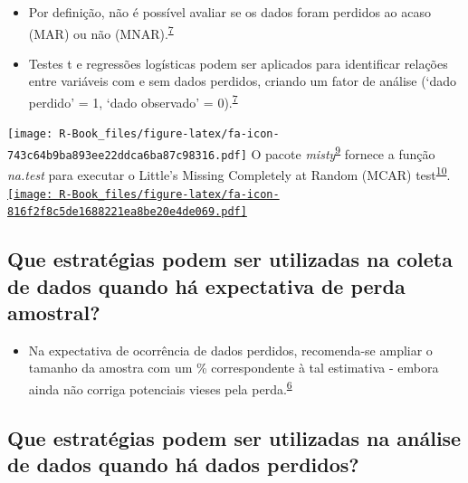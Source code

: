 \documentclass[
]{book}
\providecommand{\tightlist}{%
  \setlength{\itemsep}{0pt}\setlength{\parskip}{0pt}}
\begin{document}
\begin{itemize}
\item
  Por definição, não é possível avaliar se os dados foram perdidos ao acaso (MAR) ou não (MNAR).\textsuperscript{\protect\hyperlink{ref-Heymans2022}{7}}
\item
  Testes t e regressões logísticas podem ser aplicados para identificar relações entre variáveis com e sem dados perdidos, criando um fator de análise (`dado perdido' = 1, `dado observado' = 0).\textsuperscript{\protect\hyperlink{ref-Heymans2022}{7}}
\end{itemize}

\texttt{[image: R-Book\_files/figure-latex/fa-icon-743c64b9ba893ee22ddca6ba87c98316.pdf]} O pacote \emph{misty}\textsuperscript{\protect\hyperlink{ref-misty}{9}} fornece a função \emph{na.test} para executar o Little's Missing Completely at Random (MCAR) test\textsuperscript{\protect\hyperlink{ref-little1988}{10}}. \href{https://cran.r-project.org/web/packages/misty/index.html}{\texttt{[image: R-Book\_files/figure-latex/fa-icon-816f2f8c5de1688221ea8be20e4de069.pdf]}}

\hypertarget{que-estratuxe9gias-podem-ser-utilizadas-na-coleta-de-dados-quando-huxe1-expectativa-de-perda-amostral}{%
\subsection{Que estratégias podem ser utilizadas na coleta de dados quando há expectativa de perda amostral?}\label{que-estratuxe9gias-podem-ser-utilizadas-na-coleta-de-dados-quando-huxe1-expectativa-de-perda-amostral}}

\begin{itemize}
\tightlist
\item
  Na expectativa de ocorrência de dados perdidos, recomenda-se ampliar o tamanho da amostra com um \% correspondente à tal estimativa - embora ainda não corriga potenciais vieses pela perda.\textsuperscript{\protect\hyperlink{ref-Altman2007}{6}}
\end{itemize}

\hypertarget{que-estratuxe9gias-podem-ser-utilizadas-na-anuxe1lise-de-dados-quando-huxe1-dados-perdidos}{%
\subsection{Que estratégias podem ser utilizadas na análise de dados quando há dados perdidos?}\label{que-estratuxe9gias-podem-ser-utilizadas-na-anuxe1lise-de-dados-quando-huxe1-dados-perdidos}}
\end{document}
